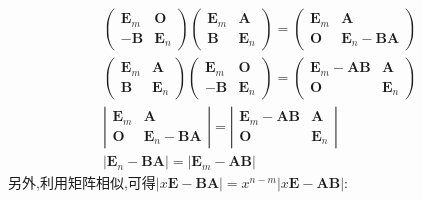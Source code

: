\documentclass{article}
\begin{document}
				$$
				\begin{gathered}
					\left(\begin{array}{cc}
						\boldsymbol E_{m} & \boldsymbol O \\
						-\boldsymbol B & \boldsymbol E_{n}
					\end{array}\right)\left(\begin{array}{cc}
						\boldsymbol E_{m} & \boldsymbol A \\
						\boldsymbol B & \boldsymbol E_{n}
					\end{array}\right)=\left(\begin{array}{cc}
						\boldsymbol E_{m} & \boldsymbol A \\
						\boldsymbol O & \boldsymbol E_{n}-\boldsymbol B \boldsymbol A
					\end{array}\right)\\
					\left(\begin{array}{cc}
						\boldsymbol E_{m} & \boldsymbol A \\
						\boldsymbol B & \boldsymbol E_{n}
					\end{array}\right)\left(\begin{array}{cc}
						\boldsymbol E_{m} & \boldsymbol O \\
						-\boldsymbol B & \boldsymbol E_{n}
					\end{array}\right)=\left(\begin{array}{cc}
						\boldsymbol E_{m}-\boldsymbol A \boldsymbol B & \boldsymbol A \\
						\boldsymbol O & \boldsymbol E_{n}
					\end{array}\right) \\
					\left|\begin{array}{cc}
						\boldsymbol E_{m} & \boldsymbol A \\
						\boldsymbol O & \boldsymbol E_{n}-\boldsymbol B \boldsymbol A
					\end{array}\right|=\left|\begin{array}{cc}
						\boldsymbol E_{m}-\boldsymbol A \boldsymbol B & \boldsymbol A \\
						\boldsymbol O & \boldsymbol E_{n}
					\end{array}\right|\\
					|\boldsymbol E_{n}-\boldsymbol B \boldsymbol A|=|\boldsymbol 	E_{m}-\boldsymbol A \boldsymbol B|
				\end{gathered}
				$$
				另外,利用矩阵相似,可得$|x \boldsymbol E-\boldsymbol B \boldsymbol A|=x^{n-m}|x \boldsymbol E-\boldsymbol A \boldsymbol B|$:
\end{document}
